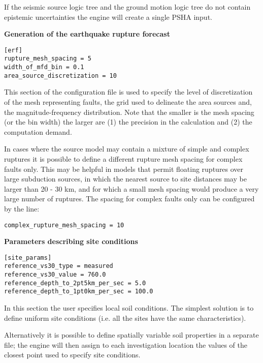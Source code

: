 If the seismic source logic tree and the ground motion logic tree do not
contain epistemic uncertainties the engine will create a single PSHA input.

\textbf{Generation of the earthquake rupture forecast}

\begin{verbatim}
[erf]
rupture_mesh_spacing = 5
width_of_mfd_bin = 0.1
area_source_discretization = 10
\end{verbatim}

This section of the configuration file is used to specify the level of
discretization of the mesh representing faults, the grid used to delineate the
area sources and, the magnitude-frequency distribution. Note that the smaller
is the mesh spacing (or the bin width) the larger are (1) the precision in the
calculation and (2) the computation demand.

In cases where the source model may contain a mixture of simple and complex
ruptures it is possible to define a different rupture mesh spacing for complex
faults only. This may be helpful in models that permit floating ruptures over
large subduction sources, in which the nearest source to site distances may be
larger than 20 - 30 km, and for which a small mesh spacing would produce a
very large number of ruptures. The spacing for complex faults only can be
configured by the line:

\begin{verbatim}
complex_rupture_mesh_spacing = 10
\end{verbatim}

\textbf{Parameters describing site conditions}

\begin{verbatim}
[site_params]
reference_vs30_type = measured
reference_vs30_value = 760.0
reference_depth_to_2pt5km_per_sec = 5.0
reference_depth_to_1pt0km_per_sec = 100.0
\end{verbatim}

In this section the user specifies local soil conditions. The simplest
solution is to define uniform site conditions (i.e. all the sites have  the
same characteristics).

Alternatively it is possible to define spatially variable soil properties in
a separate file; the engine will then assign to each investigation location
the values of the closest point used to specify site conditions.

